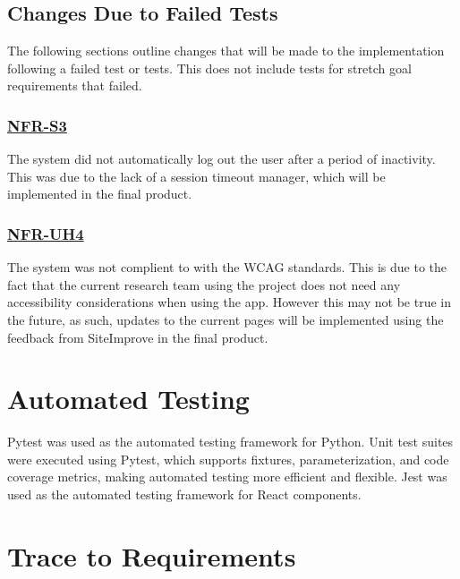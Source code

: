 \documentclass[12pt, titlepage]{article}
\begin{document}

\subsection{Changes Due to Failed Tests}
The following sections outline changes that will be made to the implementation
following a failed test or tests. This does not include tests for stretch goal
requirements that failed.

\subsubsection{\hyperref[NFR:S3]{NFR-S3}} The system did not automatically log
out the user after a period of inactivity. This was due to the lack of a session
timeout manager, which will be implemented in the final product.

\subsubsection{\hyperref[NFR:UH4]{NFR-UH4}} The system was not complient to with
the WCAG standards. This is due to the fact that the current research team using
the project does not need any accessibility considerations when using the app.
However this may not be true in the future, as such, updates to the current
pages will be implemented using the feedback from SiteImprove in the final
product.

\section{Automated Testing}
Pytest was used as the automated testing framework for Python. Unit test suites
were executed using Pytest, which supports fixtures, parameterization, and code
coverage metrics, making automated testing more efficient and flexible. Jest was
used as the automated testing framework for React components.
		
\section{Trace to Requirements}
\end{document}

